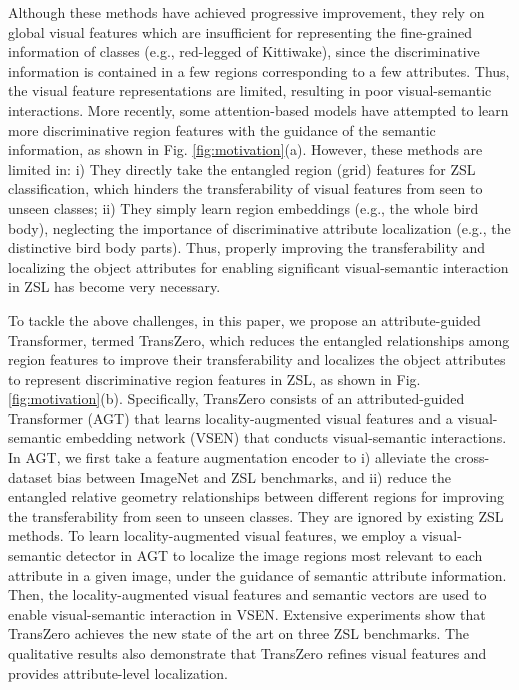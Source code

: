 \documentclass[letterpaper]{article} %
\begin{document}
	Although these methods have achieved progressive improvement, they rely on global visual features which are insufficient for representing the fine-grained information of classes (e.g., red-legged of Kittiwake), since the discriminative information is contained in a few regions corresponding to a few attributes. Thus, the visual feature representations are limited, resulting in poor visual-semantic interactions. More recently, some attention-based models \cite{Xie2019AttentiveRE,Xie2020RegionGE,Zhu2019SemanticGuidedML,Xu2020AttributePN,Yu2018StackedSA,Liu2019AttributeAF} have attempted to learn more discriminative region features with the guidance of the semantic information, as shown in Fig. \ref{fig:motivation}(a). However, these methods are limited in: i) They directly take the entangled region (grid) features for ZSL classification, which hinders the transferability of visual features from seen to unseen classes; ii) They simply learn region embeddings (e.g., the whole bird body), neglecting the importance of discriminative attribute localization (e.g., the distinctive bird body parts). Thus, properly improving the transferability and localizing the object attributes for enabling significant visual-semantic interaction in ZSL has become very necessary.
	
	To tackle the above challenges, in this paper, we propose an attribute-guided Transformer, termed TransZero, which reduces the entangled relationships among region features to improve their transferability and localizes the object attributes to represent discriminative region features in ZSL, as shown in Fig. \ref{fig:motivation}(b). Specifically, TransZero consists of an attributed-guided Transformer (AGT) that learns locality-augmented visual features and a visual-semantic embedding network (VSEN) that conducts visual-semantic interactions. In AGT, we first take a feature augmentation encoder to i) alleviate the cross-dataset bias between ImageNet and ZSL benchmarks, and ii) reduce the entangled relative geometry relationships between different regions for improving the transferability from seen to unseen classes. They are ignored by existing ZSL methods. To learn locality-augmented visual features, we employ a visual-semantic detector in AGT to localize the image regions most relevant to each attribute in a given image, under the guidance of semantic attribute information. Then, the locality-augmented visual features and semantic vectors are used to enable visual-semantic interaction in VSEN.  Extensive experiments show that TransZero achieves the new state of the art on three ZSL benchmarks. The qualitative results also demonstrate that TransZero refines visual features and provides attribute-level localization. 
	
\end{document}
